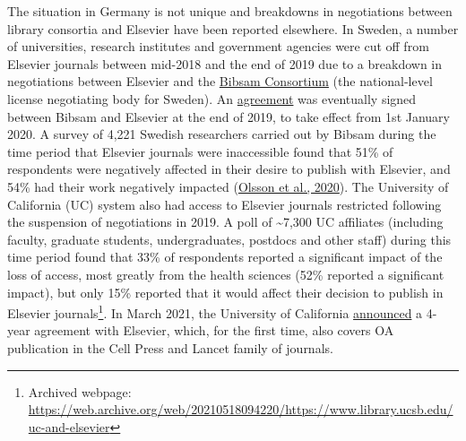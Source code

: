 \documentclass[
]{article}
\begin{document}
The situation in Germany is not unique and breakdowns in negotiations between library consortia and Elsevier have been reported elsewhere. In Sweden, a number of universities, research institutes and government agencies were cut off from Elsevier journals between mid-2018 and the end of 2019 due to a breakdown in negotiations between Elsevier and the \href{https://www.kb.se/samverkan-och-utveckling/oppen-tillgang-och-bibsamkonsortiet.html}{Bibsam Consortium} (the national-level license negotiating body for Sweden). An \href{https://www.kb.se/download/18.a9bd5bf1707b0801cd15e/1582893792629/Bibsam-Elsevier-2020-2022-tobepublished-titlelistexcluded.pdf}{agreement} was eventually signed between Bibsam and Elsevier at the end of 2019, to take effect from 1st January 2020. A survey of 4,221 Swedish researchers carried out by Bibsam during the time period that Elsevier journals were inaccessible found that 51\% of respondents were negatively affected in their desire to publish with Elsevier, and 54\% had their work negatively impacted (\href{http://doi.org/10.1629/uksg.507}{Olsson et al., 2020}). The University of California (UC) system also had access to Elsevier journals restricted following the suspension of negotiations in 2019. A poll of \textasciitilde7,300 UC affiliates (including faculty, graduate students, undergraduates, postdocs and other staff) during this time period found that 33\% of respondents reported a significant impact of the loss of access, most greatly from the health sciences (52\% reported a significant impact), but only 15\% reported that it would affect their decision to publish in Elsevier journals\footnote{Archived webpage: \url{https://web.archive.org/web/20210518094220/https://www.library.ucsb.edu/uc-and-elsevier}}. In March 2021, the University of California \href{https://osc.universityofcalifornia.edu/2021/03/uc-secures-landmark-oa-deal-with-worlds-largest-scientific-publisher/}{announced} a 4-year agreement with Elsevier, which, for the first time, also covers OA publication in the Cell Press and Lancet family of journals.
\end{document}
